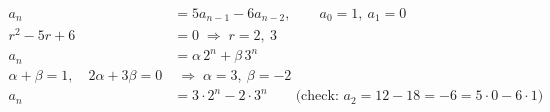 \begin{formulas}
\begin{align*}
a_n &= 5a_{n-1} - 6a_{n-2},\qquad a_0 = 1,\ a_1 = 0\\
r^2 - 5r + 6 &= 0 \;\Rightarrow\; r = 2,\ 3\\
a_n &= \alpha\,2^n + \beta\,3^n\\
\alpha + \beta = 1,\quad 2\alpha + 3\beta = 0 &\;\Rightarrow\; \alpha = 3,\ \beta = -2\\
a_n &= 3\cdot 2^n - 2\cdot 3^n \qquad\bigl(\text{check: } a_2 = 12 - 18 = -6 = 5\cdot 0 - 6\cdot 1\bigr)
\end{align*}
\end{formulas}
